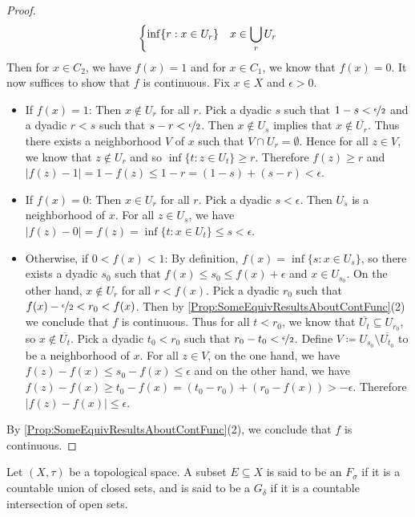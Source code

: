 \documentclass[screen,single]{techreport}
\numberwithin{equation}{section}
\begin{document}
\begin{proof}
\[\begin{dcases}
 		\inf \{r : x \in U_r\} & x \in \bigcup_r U_r
	\end{dcases}
	\]
	Then for $x \in C_2$, we have $f(x) = 1$ and for $x \in C_1$, we know that $f(x) = 0$.
	It now suffices to show that $f$ is continuous.
	Fix $x \in X$ and $\epsilon > 0$.
	\begin{itemize}
		\item If $f(x) = 1$: Then $x \not\in U_r$ for all $r$.
		Pick a dyadic $s$ such that $1 - s < \nicefrac{\epsilon}{2}$ and a dyadic $r < s$ such that $s - r < \nicefrac{\epsilon}{2}$.
		Then $x \not\in U_s$ implies that $x \not\in \overline{U_r}$.
		Thus there exists a neighborhood $V$ of $x$ such that $V \cap U_r = \emptyset$.
		Hence for all $z \in V$, we know that $z \not\in U_r$ and so $\inf\{t : z \in U_t\} \ge r$.
		Therefore $f(z) \ge r$ and $|f(z) - 1| = 1 - f(z) \le 1 - r = (1-s) + (s-r) < \epsilon$.
		
		\item If $f(x) = 0$: Then $x \in U_r$ for all $r$.
		Pick a dyadic $s < \epsilon$. Then $U_s$ is a neighborhood of $x$.
		For all $z \in U_s$, we have $|f(z) - 0| = f(z) = \inf\{ t : x \in U_t\} \le s < \epsilon$.
		
		\item Otherwise, if $0 < f(x) < 1$:
		By definition, $f(x) = \inf\{ s : x \in U_s\}$, so there exists a dyadic $s_0$ such that $f(x) \le s_0 \le f(x) + \epsilon$ and $x \in U_{s_0}$.
		On the other hand, $x \not\in U_r$ for all $r < f(x)$.
		Pick a dyadic $r_0$ such that $f(x) - \nicefrac{\epsilon}{2} < r_0 < f(x)$.
		Then by \cref{Prop:SomeEquivResultsAboutContFunc}(2) we conclude that $f$ is continuous.
		Thus for all $t < r_0$, we know that $\overline{U_t} \subseteq U_{r_0}$, so $x \not\in \overline{U_t}$.
		Pick a dyadic $t_0 < r_0$ such that $r_0 - t_0 < \nicefrac{\epsilon}{2}$.
		Define $V \coloneqq U_{s_0} \setminus \overline{U_{t_0}}$ to be a neighborhood of $x$.
		For all $z \in V$, on the one hand, we have $f(z) - f(x) \le s_0 - f(x) \le \epsilon$ and on the other hand, we have $f(z) - f(x) \ge t_0 - f(x) = (t_0 - r_0) + (r_0 - f(x)) > -\epsilon$.
		Therefore $|f(z) - f(x)| \le \epsilon$.
	\end{itemize}
	By \cref{Prop:SomeEquivResultsAboutContFunc}(2), we conclude that $f$ is continuous.
\end{proof}

\begin{definition}\label{De:FsigmaGdelta}
	Let $(X,\tau)$ be a topological space.
	A subset $E \subseteq X$ is said to be an $F_\sigma$ if it is a countable union of closed sets, and is said to be a $G_\delta$ if it is a countable intersection of open sets.
\end{definition}
\end{document}
